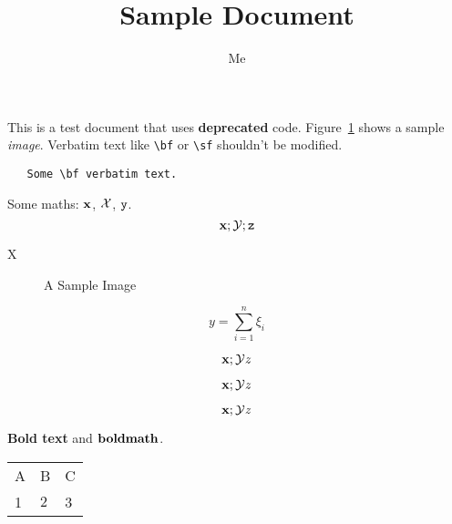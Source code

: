 \documentclass[12pt,a4paper]{article}
\title{Sample Document}
\author{Me}
\newcommand{\boldstuff}[1]{{\bf #1}}
\begin{document}
\maketitle

This is a test {\sf document} that uses {\bf  deprecated} code.
Figure~\ref{fig:sample} shows a sample {\it image}.
  Verbatim text like \verb|\bf| or \verb|\sf| shouldn't be
modified. 
\begin{verbatim}
   Some \bf verbatim text.
\end{verbatim}

Some maths: $\bf x$, \begin{math}\cal X\end{math},
\(\tt y\).
\[
  {\bf x}; {\cal Y}; {\tt z}
\]

   \centerline{X}

\begin{figure}
\centerline{}
\caption{A Sample Image}
\label{fig:sample}
\end{figure}

$$y = \sum_{i=1}^n \xi_i$$

$${\bf x}; {\cal Y} {\it z}$$

\begin{displaymath}
{\bf x}; {\cal Y} {\it z}
\end{displaymath}

\begin{equation}
{\bf x}; {\cal Y} {\it z}
\end{equation}

\boldstuff{Bold text} and $\boldstuff{bold math}$.

\begin{table}
{\begin{tabular}{lll}
 A & B & C\\
 1 & $2$ & 3
 \end{tabular}
}
\end{table}
\end{document}

